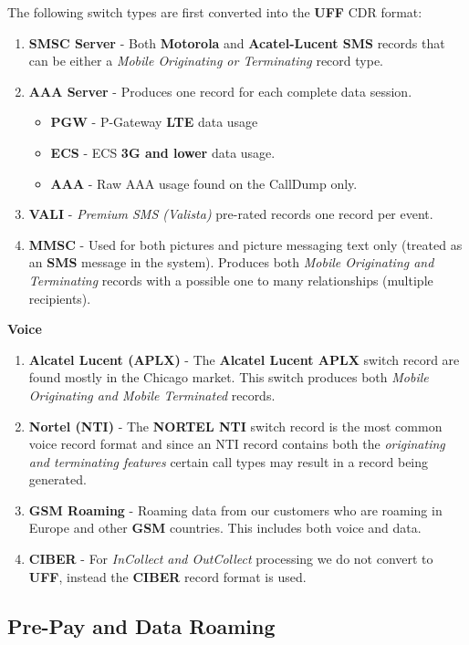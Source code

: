 \documentclass[12pt,twoside]{article}
\begin{document}
    The following switch types are first converted into the \textbf{UFF} CDR format:\\
\begin{enumerate}
\item \textbf{SMSC Server} - Both \textbf{Motorola} and \textbf{Acatel-Lucent SMS} records that can be either a \emph{Mobile Originating or Terminating} record type.
\item \textbf{AAA Server} - Produces one record for each complete data session.
\begin{itemize}
\item \textbf{PGW} - P-Gateway \textbf{LTE} data usage
\item \textbf{ECS} - ECS \textbf{3G and lower} data usage.
\item \textbf{AAA} - Raw AAA usage found on the CallDump only.
\end{itemize}
\item \textbf{VALI} - \emph{Premium SMS (Valista)} pre-rated records one record per event.
\item \textbf{MMSC} - Used for both pictures and picture messaging text only (treated as an \textbf{SMS} message in the system). Produces both \emph{Mobile Originating and Terminating} records with a possible one to many relationships (multiple recipients). \\
\end{enumerate}
    \textbf{Voice}
\begin{enumerate}
\item \textbf{Alcatel Lucent (APLX)} - The \textbf{Alcatel Lucent APLX} switch record are found mostly in the Chicago market. This switch produces both \emph{Mobile Originating and Mobile Terminated} records.
\item \textbf{Nortel (NTI)} - The \textbf{NORTEL NTI} switch record is the most common voice record format and since an NTI record contains both the \emph{originating and terminating features} certain call types may result in a record being generated.
\item \textbf{GSM Roaming} - Roaming data from our customers who are roaming in Europe and other \textbf{GSM} countries. This includes both voice and data.
\item \textbf{CIBER} - For \emph{InCollect and OutCollect} processing we do not convert to \textbf{UFF}, instead the \textbf{CIBER} record format is used.
\end{enumerate}
\subsection{Pre-Pay and Data Roaming}
\label{sec-2-2}
\end{document}
